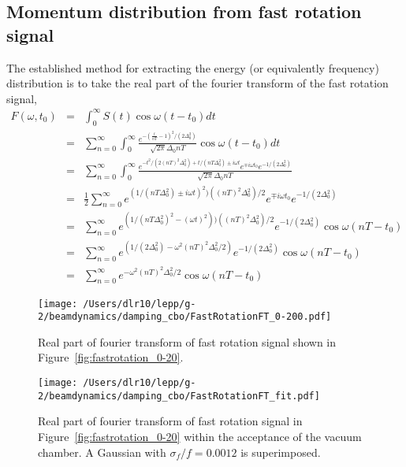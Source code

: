 \documentclass[10pt]{report}
\begin{document}
\subsection*{Momentum distribution from fast rotation signal}
The established method for extracting the energy (or equivalently frequency) distribution is to take the real part of the fourier transform of the fast rotation signal\cite{orlov},
\begin{eqnarray}
F(\omega,t_0) &=&\int_0^\infty S(t)\cos\omega(t-t_0) dt\nonumber\\
&=& \sum_{n=0}^\infty \int_0^\infty
\frac{e^{-(\frac{t}{nT}-1)^2/(2\Delta_0^2)}}{\sqrt{2\pi}\Delta_0 nT}\cos\omega(t-t_0) dt\nonumber\\
&=& \sum_{n=0}^\infty \int_0^\infty
\frac{e^{-t^2/(2(nT)^2\Delta_0^2)+t/(nT\Delta_0^2)\pm i\omega t}e^{\mp i\omega t_0}e^{-1/(2\Delta_0^2)}}{\sqrt{2\pi}\Delta_0 nT}\nonumber\\
&=& \frac{1}{2}\sum_{n=0}^\infty 
e^{(1/(nT\Delta_0^2)\pm i\omega t)^2)((nT)^2\Delta_0^2)/2}e^{\mp i\omega t_0}e^{-1/(2\Delta_0^2)}\nonumber\\
&=&\sum_{n=0}^\infty 
e^{(1/(nT\Delta_0^2)^2-(\omega t)^2))((nT)^2\Delta_0^2)/2}e^{-1/(2\Delta_0^2)}\cos\omega(nT-t_0)\nonumber\\
&=&\sum_{n=0}^\infty 
e^{(1/(2\Delta_0^2)-\omega ^2(nT)^2\Delta_0^2/2)}e^{-1/(2\Delta_0^2)}\cos\omega(nT-t_0)\nonumber\\
&=&\sum_{n=0}^\infty e^{-\omega^2(nT)^2\Delta_0^2/2}\cos\omega(nT-t_0)\label{eq:ftoffr}
\end{eqnarray}
\begin{figure}[htbp] %
\begin{minipage}[t]{0.48\textwidth}
   \centering
   \texttt{[image: /Users/dlr10/lepp/g-2/beamdynamics/damping\_cbo/FastRotationFT\_0-200.pdf]} 
   \caption{Real part of fourier transform of fast rotation signal shown in Figure~\ref{fig:fastrotation_0-20}. \label{fig:fastrotationft_0-200}}
 \end{minipage}
\hfill
\begin{minipage}[t]{0.48\textwidth}
\centering
   \texttt{[image: /Users/dlr10/lepp/g-2/beamdynamics/damping\_cbo/FastRotationFT\_fit.pdf]} 
\caption{Real part of fourier transform of fast rotation signal in Figure~\ref{fig:fastrotation_0-20} within the acceptance of the vacuum chamber. A Gaussian with
$\sigma_f/f = 0.0012$ is superimposed.
   \label{fig:fastrotationft_fit}}
\end{minipage}
\end{figure}
\end{document}
